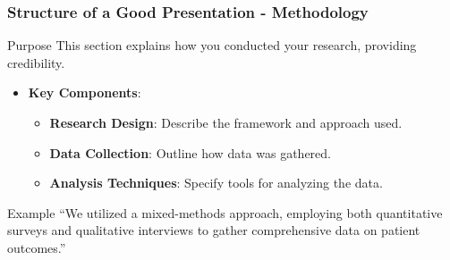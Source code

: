 \documentclass[aspectratio=169]{beamer}
\begin{document}
\begin{frame}[fragile]
    \frametitle{Structure of a Good Presentation - Methodology}
    \begin{block}{Purpose}
        This section explains how you conducted your research, providing credibility.
    \end{block}
    
    \begin{itemize}
        \item \textbf{Key Components}:
        \begin{itemize}
            \item \textbf{Research Design}: Describe the framework and approach used.
            \item \textbf{Data Collection}: Outline how data was gathered.
            \item \textbf{Analysis Techniques}: Specify tools for analyzing the data.
        \end{itemize}
    \end{itemize}

    \begin{block}{Example}
        “We utilized a mixed-methods approach, employing both quantitative surveys and qualitative interviews to gather comprehensive data on patient outcomes.”
    \end{block}
\end{frame}
\end{document}
